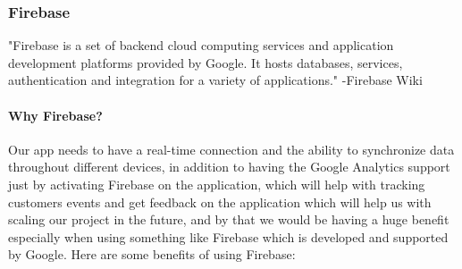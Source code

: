 \documentclass[a4paper, 12pt]{article} %
\begin{document}
            \subsubsection{Firebase}
                "Firebase is a set of backend cloud computing services and application development platforms provided by Google. It hosts databases, services, authentication and integration for a variety of applications." -Firebase Wiki \cite{firebase_wiki}
                
                \paragraph{Why Firebase?} 
                
                Our app needs to have a real-time connection and the ability to synchronize data throughout different devices, in addition to having the Google Analytics support just by activating Firebase on the application, which will help with tracking customers events and get feedback on the application which will help us with scaling our project in the future, and by that we would be having a  huge benefit especially when using something like Firebase which is developed and supported by Google. Here are some benefits of using Firebase:
                
\end{document}
